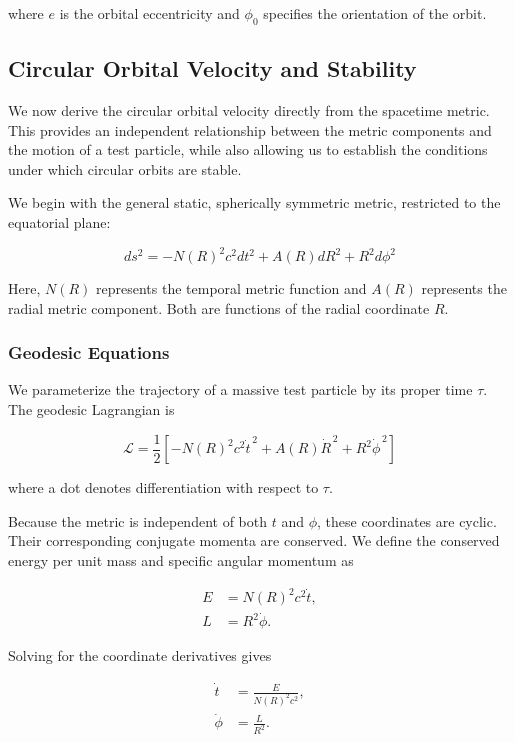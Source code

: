 \documentclass[pdflatex,sn-mathphys-num]{sn-jnl}%
\theoremstyle{thmstyleone}%
\theoremstyle{thmstyletwo}%
\theoremstyle{thmstylethree}%
\begin{document}
\begin{appendices}
where $e$ is the orbital eccentricity and $\phi_0$ specifies the orientation of the orbit.

\subsection{Circular Orbital Velocity and Stability}

We now derive the circular orbital velocity directly from the spacetime metric. This provides an independent relationship between the metric components and the motion of a test particle, while also allowing us to establish the conditions under which circular orbits are stable.

We begin with the general static, spherically symmetric metric, restricted to the equatorial plane:

\begin{equation}
ds^2
=
-N(R)^2c^2dt^2
+
A(R)dR^2
+
R^2d\phi^2
\end{equation}

Here, $N(R)$ represents the temporal metric function and $A(R)$ represents the radial metric component. Both are functions of the radial coordinate $R$.

\subsubsection{Geodesic Equations}

We parameterize the trajectory of a massive test particle by its proper time $\tau$. The geodesic Lagrangian is

\begin{equation}
\mathcal{L}
=
\frac{1}{2}
\left[
-N(R)^2c^2\dot{t}^{\,2}
+
A(R)\dot{R}^{\,2}
+
R^2\dot{\phi}^{\,2}
\right]
\end{equation}

where a dot denotes differentiation with respect to $\tau$.

Because the metric is independent of both $t$ and $\phi$, these coordinates are cyclic. Their corresponding conjugate momenta are conserved. We define the conserved energy per unit mass and specific angular momentum as

\begin{align}
E &= N(R)^2c^2\dot{t}, \\
L &= R^2\dot{\phi}.
\end{align}

Solving for the coordinate derivatives gives

\begin{align}
\dot{t} &= \frac{E}{N(R)^2c^2}, \\
\dot{\phi} &= \frac{L}{R^2}.
\end{align}


\end{appendices}
\end{document}
